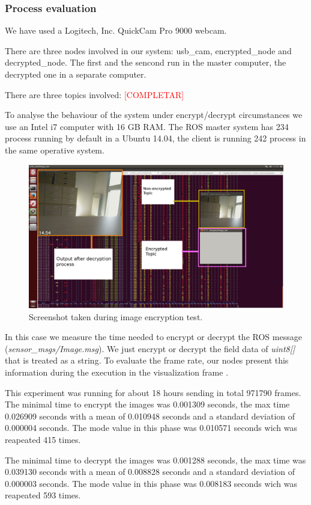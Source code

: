 \documentclass[journal,twoside]{JoPhA}
\begin{document}
\subsubsection{Process evaluation}

We have used a Logitech, Inc. QuickCam Pro 9000 webcam.

There are three nodes involved in our system: usb\_cam, encrypted\_node and decrypted\_node. The first and the sencond run in the master computer, the decrypted one in a separate computer.

There are three topics involved: \textcolor{red}{[COMPLETAR]}

To analyse the behaviour of the system under encrypt/decrypt circumstances we use an Intel i7 computer with 16 GB RAM. The ROS master system has 234 process running by default in a Ubuntu 14.04, the client is running 242 process in the same operative system.

\begin{figure}[ht]
    \centering
    \includegraphics[width=.5\textwidth]{Screenshot.png}
    \caption{Screenshot taken during image encryption test.}
  \label{fig:screenshot}
\end{figure}

In this case we measure the time needed to encrypt or decrypt the ROS message ({\em sensor\_msgs/Image.msg}). We just encrypt or decrypt the field data of {\em uint8[]} that is treated as a string.
To evaluate  the frame rate, our nodes present this information during the execution in the visualization frame . 

This experiment was running for about 18 hours sending in total 971790 frames. The minimal time to encrypt the images was 0.001309 seconds, the max time  0.026909 seconds with a 
mean of  0.010948 seconds and a standard deviation of 0.000004 seconds. The mode value in this phase was 0.010571 seconds wich was reapeated 415 times. 

The minimal time to decrypt the images was 0.001288 seconds, the max time was 0.039130 seconds with a 
mean of  0.008828 seconds and a standard deviation of 0.000003 seconds. The mode value in this phase was 0.008183 seconds wich was reapeated 593 times. 
\end{document}

